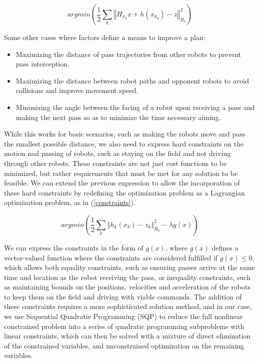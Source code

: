 \documentclass[a4paper, 10pt, conference]{ieeeconf}      %
\begin{document}
\begin{equation} \label{eq:full_linear_factor}
argmin(\frac{1}{2}\sum_{k}\left\Vert H_{x_{k}}x+h(x_{k_{0}})-z\right\Vert _{R_{k}}^{2})
\end{equation}

Some other cases where factors define a means to improve a plan:
\begin{itemize}
 \item Maximizing the distance of pass trajectories from other robots to prevent pass interception.
 \item Maximizing the distance between robot paths and opponent robots to avoid collisions and improve movement speed.
 \item Minimizing the angle between the facing of a robot upon receiving a pass and making the next pass so as to minimize the time necessary aiming.  
\end{itemize}


While this works for basic scenarios, such as making the robots move and pass the smallest possible distance, we also need to express hard constraints on the motion nad passing of robots, such as staying on the field and not driving through other robots.  These constraints are not just cost functions to be minimized, but rather requirements that must be met for any solution to be feasible.  We can extend the previous expression to allow the incorporation of these hard constraints by redefining the optimization problem as a Lagrangian optimization problem, as in (\ref{constraints}).  

\begin{equation} \label{constraints}
 argmin(\frac{1}{2}\sum_{k}\left\Vert h_{k}(x_{k})-z_{k}\right\Vert _{R_{k}}^{2}-\lambda g(x))
\end{equation} 

We can express the constraints in the form of $g(x)$, where $g(x)$ defines a vector-valued function where the constraints are considered fulfilled if $g(x)\leq 0$, which allows both equality constraints, such as ensuring passes arrive at the same time and location as the robot receiving the pass, or inequality constraints, such as maintaining bounds on the positions, velocities and acceleration of the robots to keep them on the field and driving with viable commands.  The addition of these constraints requires a more sophisticated solution method, and in our case, we use Sequential Quadratic Programming (SQP) to reduce the full nonlinear constrained problem into a series of quadratic programming subproblems with linear constraints, which can then be solved with a mixture of direct elimination of the constrained variables, and unconstrained optimization on the remaining variables\cite{Fletcher87book}. 
\end{document}
